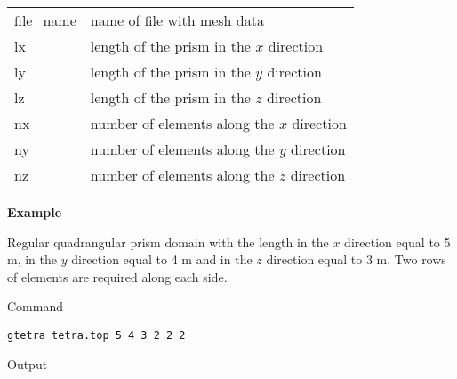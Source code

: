 \documentclass[12pt]{book}
\begin{document}
\vspace{2mm}
\noindent
\begin{center}
\begin{tabular}{ll}
file\_name & name of file with mesh data
\\
lx & length of the prism in the $x$ direction
\\
ly & length of the prism in the $y$ direction
\\
lz & length of the prism in the $z$ direction
\\
nx & number of elements along the $x$ direction
\\
ny & number of elements along the $y$ direction
\\
nz & number of elements along the $z$ direction
\end{tabular}
\end{center}

\vspace{3mm}
\noindent
{\bf Example}

\noindent
Regular quadrangular prism domain with the length in the $x$ direction equal to 5 m, in the
$y$ direction equal to 4 m and in the $z$ direction equal to 3 m. Two rows of elements are required along each side.

\noindent
Command

{\tt gtetra tetra.top 5 4 3 2 2 2}

\noindent
Output
\end{document}
